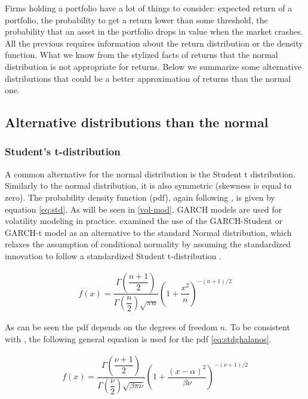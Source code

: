 \documentclass[a4paper, twoside]{templates/ociamthesis}
\begin{document}
\noindent Firms holding a portfolio have a lot of things to consider: expected return of a portfolio, the probability to get a return lower than some threshold, the probability that an asset in the portfolio drops in value when the market crashes. All the previous requires information about the return distribution or the density function. What we know from the stylized facts of returns that the normal distribution is not appropriate for returns. Below we summarize some alternative distributions that could be a better approximation of returns than the normal one.

\hypertarget{conditional-distributions}{%
\subsection{Alternative distributions than the normal}\label{conditional-distributions}}

\hypertarget{students-t-distribution}{%
\subsubsection{Student's t-distribution}\label{students-t-distribution}}

\noindent A common alternative for the normal distribution is the Student t distribution. Similarly to the normal distribution, it is also symmetric (skewness is equal to zero). The probability density function (pdf), again following \textcite{annaert2021}, is given by equation \eqref{eq:std}. As will be seen in \ref{vol-mod}, GARCH models are used for volatility modeling in practice. \textcite{bollerslev1987} examined the use of the GARCH-Student or GARCH-t model as an alternative to the standard Normal distribution, which relaxes the assumption of conditional normality by assuming the standardized innovation to follow a standardized Student t-distribution \autocite{bollerslev2008}.

\begin{align}
f(x) = \dfrac{\Gamma(\dfrac{n+1}{2})}{\Gamma(\dfrac{n}{2})\sqrt{\pi n}} (1+\dfrac{x^2}{n})^{-(n+1)/2}
 \label{eq:std}
\end{align}

\noindent As can be seen the pdf depends on the degrees of freedom \(n\). To be consistent with \textcite{ghalanos2020}, the following general equation is used for the pdf \eqref{eq:stdghalanos}.

\begin{align}
f(x) = \dfrac{\Gamma(\dfrac{\nu+1}{2})}{\Gamma(\dfrac{\nu}{2})\sqrt{\beta \pi \nu}} \left(1+\dfrac{(x-\alpha)^2}{\beta \nu}\right)^{-(\nu+1)/2}
 \label{eq:stdghalanos}
\end{align}
\end{document}
